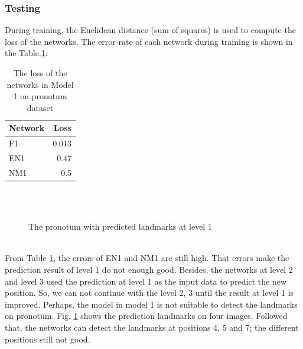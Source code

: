\subsubsection{Testing}
During training, the Euclidean distance (sum of squares) is used to compute the loss of the networks. The error rate of each network during training is shown in the Table.\ref{model1p}:\\
\begin{table}[h!]
	\centering
	\begin{tabular}{l r}
	Network & Loss \\ \hline
	F1 & 0.013 \\ \hline
	EN1 & 0.47\\ \hline
	NM1 &  0.5
	\end{tabular}
	\caption{The loss of the networks in Model 1 on pronotum dataset}
	\label{model1p}
\end{table}
\begin{figure}[h!]
\centering
{}~~
\\
~~
\\
\caption{The pronotum with predicted landmarks at level 1}
\label{model1pTest}
\end{figure}\\
From Table \ref{model1p}, the errors of EN1 and NM1 are still high. That errors make the prediction result of level 1 do not enough good. Besides, the networks at level 2 and level 3 used the prediction at level 1 as the input data to predict the new position. So, we can not continue with the level 2, 3 until the result at level 1 is improved. Perhaps, the model in model 1 is not suitable to detect the landmarks on pronotum.  Fig. \ref{model1pTest} shows the prediction landmarks on four images. Followed that, the networks can detect the landmarks at positions 4, 5 and 7; the different positions still not good.
